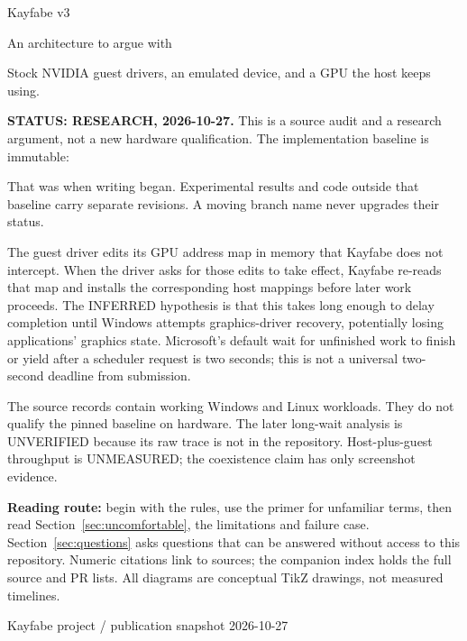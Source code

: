 \documentclass[11pt]{article}
\begin{document}
\begin{titlepage}
\centering
\vspace*{20mm}
{\Huge\sffamily Kayfabe v3\par}
\vspace{8mm}
{\LARGE An architecture to argue with\par}
\vspace{14mm}
Stock NVIDIA guest drivers, an emulated device, and a GPU the host keeps using.
\vspace{12mm}
\begin{minipage}{0.88\textwidth}
\textbf{STATUS: RESEARCH, 2026-10-27.} This is a source audit and a research argument,
not a new hardware qualification. The implementation baseline is immutable:
\begin{center}\end{center}
That was  when writing began. Experimental results and code outside that
baseline carry separate revisions. A moving branch name never upgrades their status.

The guest driver edits its GPU address map in memory that Kayfabe does not intercept. When
the driver asks for those edits to take effect, Kayfabe re-reads that map and installs the
corresponding host mappings before later work proceeds. The INFERRED hypothesis is that this
takes long enough to delay completion until Windows attempts graphics-driver recovery,
potentially losing applications' graphics state. Microsoft's default wait for unfinished
work to finish or yield after a scheduler request is two seconds; this is not a universal
two-second deadline from submission.

The source records contain working Windows and Linux workloads. They do not qualify the
pinned baseline on hardware. The later long-wait analysis is UNVERIFIED because its raw trace
is not in the repository. Host-plus-guest throughput is UNMEASURED; the coexistence claim has
only screenshot evidence.

\textbf{Reading route:} begin with the rules, use the primer for unfamiliar terms, then read
Section~\ref{sec:uncomfortable}, the limitations and failure case.
Section~\ref{sec:questions} asks questions that can be answered without access to this
repository. Numeric citations link to sources; the companion index holds the full source
and PR lists. All diagrams are conceptual TikZ drawings, not measured timelines.
\end{minipage}
\vfill
Kayfabe project \quad / \quad publication snapshot 2026-10-27
\end{titlepage}
\tableofcontents
\clearpage
{}






\appendix

\end{document}
